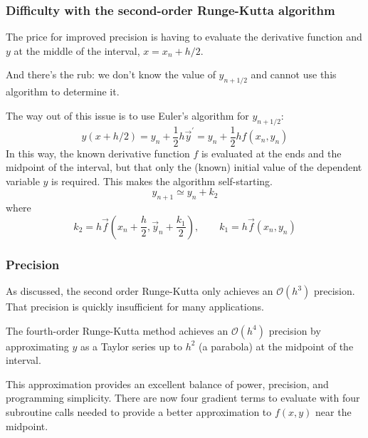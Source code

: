 \documentclass[hyperref={colorlinks=true}]{beamer}
\begin{document}
\begin{frame}%
  \frametitle{Difficulty with the second-order Runge-Kutta algorithm} 

  The price for improved precision is having to evaluate the derivative function and $y$ at the middle of the interval, $x = x_n + h/2$.
  
  \mysp
  
  And there's the rub: we don't know the value of $y_{n+1/2}$ and cannot use this algorithm to determine it.
  
  \mysp
  
  The way out of this issue is to use Euler's algorithm for $y_{n+1/2}$:
  \begin{equation}
    y(x + h/2) = y_n + \frac{1}{2}h\vec{y}^{\prime} = y_n + \frac{1}{2}hf(x_n,y_n)
  \end{equation}
  In this way, the known derivative function $f$ is evaluated at the ends and the midpoint of the interval, but that only the (known) initial value of the dependent variable $y$ is required. This makes the algorithm self-starting.
  \begin{equation}
    y_{n+1} \simeq y_n + k_2 
  \end{equation}
  where
  \begin{equation}
    k_2=h\vec{f}(x_n + \frac{h}{2}, \vec{y}_{n} + \frac{k_1}{2}), \qquad k_1 = h\vec{f}(x_n, y_n)  
  \end{equation}

\end{frame}


\begin{frame}%
  \frametitle{Precision}

  As discussed, the second order Runge-Kutta only achieves an $\mathcal{O}(h^3)$ precision. That precision is quickly insufficient for many applications.
  
  \mysp
  
  The fourth-order Runge-Kutta method achieves an $\mathcal{O}(h^4)$ precision by approximating $y$ as a Taylor series up to $h^2$ (a parabola) at the midpoint of the interval.
  
  \mysp
  
  This approximation provides an excellent balance of power, precision, and programming simplicity. There are now four gradient terms to evaluate with four subroutine calls needed to provide a better approximation to $f(x,y)$ near the midpoint.
  
\end{frame}
\end{document}
